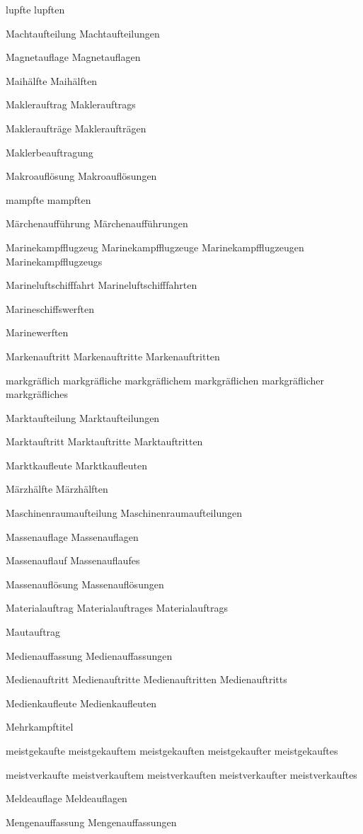 lupfte
lupften

Machtaufteilung
Machtaufteilungen

Magnetauflage
Magnetauflagen

Maihälfte
Maihälften

Maklerauftrag
Maklerauftrags

Makleraufträge
Makleraufträgen

Maklerbeauftragung

Makroauflösung
Makroauflösungen

mampfte
mampften

Märchenaufführung
Märchenaufführungen

Marinekampfflugzeug
Marinekampfflugzeuge
Marinekampfflugzeugen
Marinekampfflugzeugs

Marineluftschifffahrt
Marineluftschifffahrten

Marineschiffswerften

Marinewerften

Markenauftritt
Markenauftritte
Markenauftritten

markgräflich
markgräfliche
markgräflichem
markgräflichen
markgräflicher
markgräfliches

Marktaufteilung
Marktaufteilungen

Marktauftritt
Marktauftritte
Marktauftritten

Marktkaufleute
Marktkaufleuten

Märzhälfte
Märzhälften

Maschinenraumaufteilung
Maschinenraumaufteilungen

Massenauflage
Massenauflagen

Massenauflauf
Massenauflaufes

Massenauflösung
Massenauflösungen

Materialauftrag
Materialauftrages
Materialauftrags

Mautauftrag

Medienauffassung
Medienauffassungen

Medienauftritt
Medienauftritte
Medienauftritten
Medienauftritts

Medienkaufleute
Medienkaufleuten

Mehrkampftitel

meistgekaufte
meistgekauftem
meistgekauften
meistgekaufter
meistgekauftes

meistverkaufte
meistverkauftem
meistverkauften
meistverkaufter
meistverkauftes

Meldeauflage
Meldeauflagen

Mengenauffassung
Mengenauffassungen

